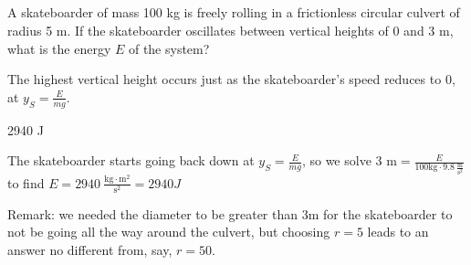 \subsection*{\Procedural}

\begin{question}
A skateboarder of mass 100 kg is freely rolling in a frictionless circular  culvert of radius 5 m. If the skateboarder oscillates between vertical heights of 0 and 3 m, what is the
 energy $E$ of the system?
\end{question}
\begin{hint}
The highest vertical height occurs just as the skateboarder's speed reduces to 0, at	$y_S=\frac{E}{mg}$.
\end{hint}
\begin{answer}
	2940 J
\end{answer}
\begin{solution}
	The skateboarder starts going back down at $y_S=\frac{E}{mg}$, so we solve $3\textrm{ m}=\frac{E}{100 \mathrm{ kg} \cdot 9.8~\frac{\mathrm{m}}{\mathrm{s}^2}}$ to find $E=2940 ~\frac{\mathrm{kg}\cdot\mathrm{m}^2}{\mathrm{s}^2}=2940 J$
	
	Remark: we needed the diameter to be greater than 3m for the skateboarder to not be going all the way around the culvert, but choosing $r=5$ leads to an answer no different from, say, $r=50$.
\end{solution}

